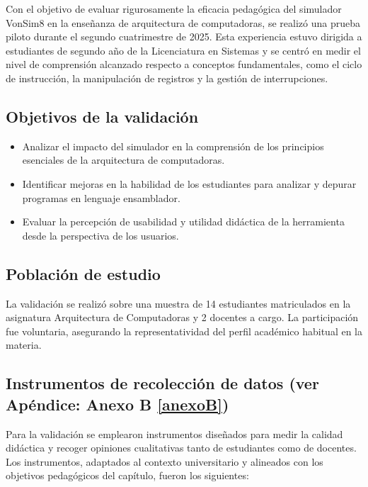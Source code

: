 \documentclass[12pt,oneside]{templates/unerthesis}
\providecommand{\tightlist}{%
  \setlength{\itemsep}{0pt}\setlength{\parskip}{0pt}}
\begin{document}
Con el objetivo de evaluar rigurosamente la eficacia pedagógica del simulador VonSim8 en la enseñanza de arquitectura de computadoras, se realizó una prueba piloto durante el segundo cuatrimestre de 2025. Esta experiencia estuvo dirigida a estudiantes de segundo año de la Licenciatura en Sistemas y se centró en medir el nivel de comprensión alcanzado respecto a conceptos fundamentales, como el ciclo de instrucción, la manipulación de registros y la gestión de interrupciones.

\hypertarget{objetivos-de-la-validaciuxf3n}{%
\subsection{Objetivos de la validación}\label{objetivos-de-la-validaciuxf3n}}

\begin{itemize}
\tightlist
\item
  Analizar el impacto del simulador en la comprensión de los principios esenciales de la arquitectura de computadoras.
\item
  Identificar mejoras en la habilidad de los estudiantes para analizar y depurar programas en lenguaje ensamblador.
\item
  Evaluar la percepción de usabilidad y utilidad didáctica de la herramienta desde la perspectiva de los usuarios.
\end{itemize}

\hypertarget{poblaciuxf3n-de-estudio}{%
\subsection{Población de estudio}\label{poblaciuxf3n-de-estudio}}

La validación se realizó sobre una muestra de 14 estudiantes matriculados en la asignatura Arquitectura de Computadoras y 2 docentes a cargo. La participación fue voluntaria, asegurando la representatividad del perfil académico habitual en la materia.

\hypertarget{instrumentos-de-recolecciuxf3n-de-datos-ver-apuxe9ndice-anexo-b-refanexob}{%
\subsection{Instrumentos de recolección de datos (ver Apéndice: Anexo B \ref{anexoB})}\label{instrumentos-de-recolecciuxf3n-de-datos-ver-apuxe9ndice-anexo-b-refanexob}}

Para la validación se emplearon instrumentos diseñados para medir la calidad didáctica y recoger opiniones cualitativas tanto de estudiantes como de docentes. Los instrumentos, adaptados al contexto universitario y alineados con los objetivos pedagógicos del capítulo, fueron los siguientes:
\end{document}
